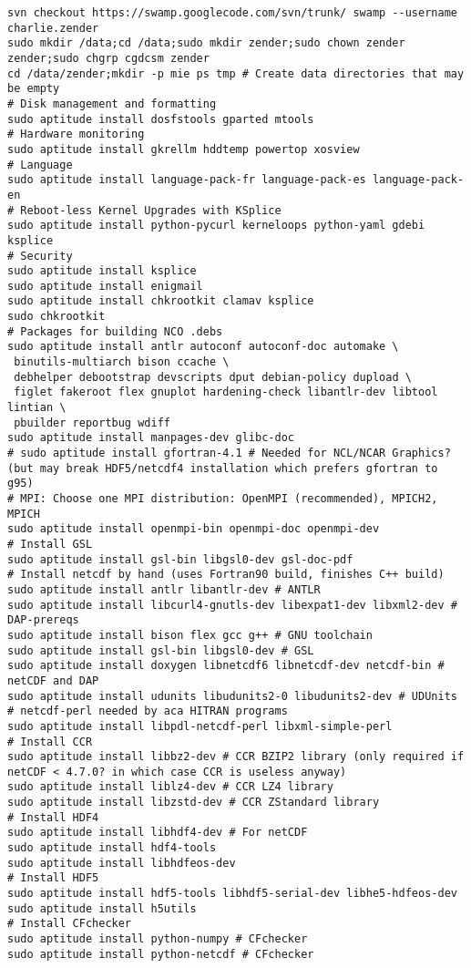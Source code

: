 \documentclass[12pt,twoside]{article}
\begin{document}
\begin{verbatim}
svn checkout https://swamp.googlecode.com/svn/trunk/ swamp --username charlie.zender
sudo mkdir /data;cd /data;sudo mkdir zender;sudo chown zender zender;sudo chgrp cgdcsm zender
cd /data/zender;mkdir -p mie ps tmp # Create data directories that may be empty
# Disk management and formatting
sudo aptitude install dosfstools gparted mtools 
# Hardware monitoring 
sudo aptitude install gkrellm hddtemp powertop xosview
# Language
sudo aptitude install language-pack-fr language-pack-es language-pack-en
# Reboot-less Kernel Upgrades with KSplice
sudo aptitude install python-pycurl kerneloops python-yaml gdebi ksplice
# Security
sudo aptitude install ksplice
sudo aptitude install enigmail
sudo aptitude install chkrootkit clamav ksplice
sudo chkrootkit
# Packages for building NCO .debs
sudo aptitude install antlr autoconf autoconf-doc automake \
 binutils-multiarch bison ccache \
 debhelper debootstrap devscripts dput debian-policy dupload \
 figlet fakeroot flex gnuplot hardening-check libantlr-dev libtool lintian \
 pbuilder reportbug wdiff
sudo aptitude install manpages-dev glibc-doc
# sudo aptitude install gfortran-4.1 # Needed for NCL/NCAR Graphics? (but may break HDF5/netcdf4 installation which prefers gfortran to g95)
# MPI: Choose one MPI distribution: OpenMPI (recommended), MPICH2, MPICH
sudo aptitude install openmpi-bin openmpi-doc openmpi-dev
# Install GSL
sudo aptitude install gsl-bin libgsl0-dev gsl-doc-pdf
# Install netcdf by hand (uses Fortran90 build, finishes C++ build)
sudo aptitude install antlr libantlr-dev # ANTLR
sudo aptitude install libcurl4-gnutls-dev libexpat1-dev libxml2-dev # DAP-prereqs
sudo aptitude install bison flex gcc g++ # GNU toolchain
sudo aptitude install gsl-bin libgsl0-dev # GSL
sudo aptitude install doxygen libnetcdf6 libnetcdf-dev netcdf-bin # netCDF and DAP
sudo aptitude install udunits libudunits2-0 libudunits2-dev # UDUnits
# netcdf-perl needed by aca HITRAN programs
sudo aptitude install libpdl-netcdf-perl libxml-simple-perl
# Install CCR
sudo aptitude install libbz2-dev # CCR BZIP2 library (only required if netCDF < 4.7.0? in which case CCR is useless anyway)
sudo aptitude install liblz4-dev # CCR LZ4 library
sudo aptitude install libzstd-dev # CCR ZStandard library
# Install HDF4
sudo aptitude install libhdf4-dev # For netCDF
sudo aptitude install hdf4-tools 
sudo aptitude install libhdfeos-dev
# Install HDF5
sudo aptitude install hdf5-tools libhdf5-serial-dev libhe5-hdfeos-dev
sudo aptitude install h5utils
# Install CFchecker
sudo aptitude install python-numpy # CFchecker
sudo aptitude install python-netcdf # CFchecker

\end{verbatim}
\end{document}
